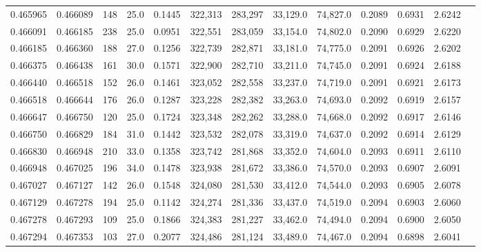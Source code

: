 \begin{tabular}{rrrrrrrrrrrrr}
0.465965 & 0.466089 &   148 & 25.0 &                                     0.1445 & 322,313 & 283,297 &  33,129.0 &  74,827.0 & 0.2089 & 0.6931 & 2.6242 \\
0.466091 & 0.466185 &   238 & 25.0 &                                     0.0951 & 322,551 & 283,059 &  33,154.0 &  74,802.0 & 0.2090 & 0.6929 & 2.6220 \\
0.466185 & 0.466360 &   188 & 27.0 &                                     0.1256 & 322,739 & 282,871 &  33,181.0 &  74,775.0 & 0.2091 & 0.6926 & 2.6202 \\
0.466375 & 0.466438 &   161 & 30.0 &                                     0.1571 & 322,900 & 282,710 &  33,211.0 &  74,745.0 & 0.2091 & 0.6924 & 2.6188 \\
0.466440 & 0.466518 &   152 & 26.0 &                                     0.1461 & 323,052 & 282,558 &  33,237.0 &  74,719.0 & 0.2091 & 0.6921 & 2.6173 \\
0.466518 & 0.466644 &   176 & 26.0 &                                     0.1287 & 323,228 & 282,382 &  33,263.0 &  74,693.0 & 0.2092 & 0.6919 & 2.6157 \\
0.466647 & 0.466750 &   120 & 25.0 &                                     0.1724 & 323,348 & 282,262 &  33,288.0 &  74,668.0 & 0.2092 & 0.6917 & 2.6146 \\
0.466750 & 0.466829 &   184 & 31.0 &                                     0.1442 & 323,532 & 282,078 &  33,319.0 &  74,637.0 & 0.2092 & 0.6914 & 2.6129 \\
0.466830 & 0.466948 &   210 & 33.0 &                                     0.1358 & 323,742 & 281,868 &  33,352.0 &  74,604.0 & 0.2093 & 0.6911 & 2.6110 \\
0.466948 & 0.467025 &   196 & 34.0 &                                     0.1478 & 323,938 & 281,672 &  33,386.0 &  74,570.0 & 0.2093 & 0.6907 & 2.6091 \\
0.467027 & 0.467127 &   142 & 26.0 &                                     0.1548 & 324,080 & 281,530 &  33,412.0 &  74,544.0 & 0.2093 & 0.6905 & 2.6078 \\
0.467129 & 0.467278 &   194 & 25.0 &                                     0.1142 & 324,274 & 281,336 &  33,437.0 &  74,519.0 & 0.2094 & 0.6903 & 2.6060 \\
0.467278 & 0.467293 &   109 & 25.0 &                                     0.1866 & 324,383 & 281,227 &  33,462.0 &  74,494.0 & 0.2094 & 0.6900 & 2.6050 \\
0.467294 & 0.467353 &   103 & 27.0 &                                     0.2077 & 324,486 & 281,124 &  33,489.0 &  74,467.0 & 0.2094 & 0.6898 & 2.6041 \\

\end{tabular}
